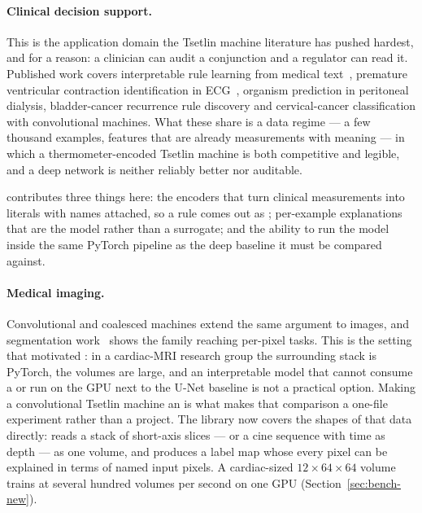 \paragraph{Clinical decision support.}
This is the application domain the Tsetlin machine literature has pushed hardest, and for a
reason: a clinician can audit a conjunction and a regulator can read it. Published work covers
interpretable rule learning from medical text~, premature ventricular contraction
identification in ECG~, organism prediction in peritoneal dialysis, bladder-cancer
recurrence rule discovery and cervical-cancer classification with convolutional machines.
What these share is a data regime --- a few thousand examples, features that are already
measurements with meaning --- in which a thermometer-encoded Tsetlin machine is both
competitive and legible, and a deep network is neither reliably better nor auditable.

\ttlibname contributes three things here: the encoders that turn clinical measurements into
literals with names attached, so a rule comes out as
; per-example explanations that
are the model rather than a surrogate; and the ability to run the model inside the same
PyTorch pipeline as the deep baseline it must be compared against.

\paragraph{Medical imaging.}
Convolutional and coalesced machines extend the same argument to images, and segmentation
work~ shows the family reaching per-pixel tasks. This is the setting that
motivated \ttlibname: in a cardiac-MRI research group the surrounding stack is PyTorch, the
volumes are large, and an interpretable model that cannot consume a  or run
on the GPU next to the U-Net baseline is not a practical option. Making a convolutional
Tsetlin machine an  is what makes that comparison a one-file experiment rather
than a project. The library now covers the shapes of that data directly:
 reads a stack of short-axis slices --- or a cine sequence with
time as depth --- as one volume, and  produces a label
map whose every pixel can be explained in terms of named input pixels. A cardiac-sized
$12\times64\times64$ volume trains at several hundred volumes per second on one GPU
(Section~\ref{sec:bench-new}).


